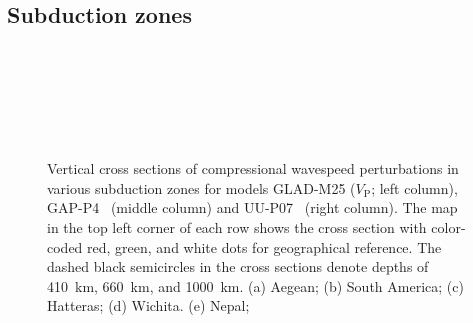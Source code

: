 \documentclass[extra,mreferee]{gji}
\begin{document}
\subsection{Subduction zones}
\label{section:slabs}

\begin{figure}
    \centering
    \\[-1pt]
    \\[-1pt]
    \\[-1pt]
    \\[-1pt]
    \\[-1pt]
    \caption{\small{Vertical cross sections of compressional wavespeed perturbations in various subduction zones
    for models GLAD-M25 ($V_\textrm{P}$; left column), GAP-P4~\citep{fukao2013subducted} (middle column) and UU-P07~\citep{van2018atlas} (right column).
    The map in the top left corner of each row shows the cross section with color-coded red, green, and white dots for geographical reference.
    The dashed black semicircles in the cross sections denote depths of 410~km, 660~km, and 1000~km.
    (a) Aegean; (b) South America; (c) Hatteras; (d) Wichita. (e) Nepal; }}
    \label{fig:subd}
\end{figure}
\end{document}
